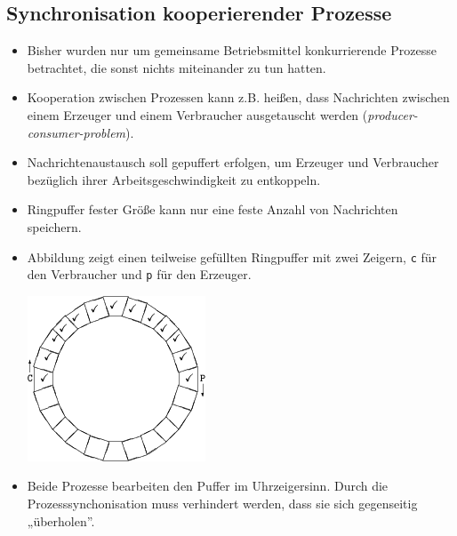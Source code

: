 \documentclass[11pt]{article}
\begin{document}
\subsection*{Synchronisation kooperierender Prozesse}
\label{sec:org7d0f23d}
\begin{itemize}
\item Bisher wurden nur um gemeinsame Betriebsmittel konkurrierende
Prozesse betrachtet, die sonst nichts miteinander zu tun hatten.
\item Kooperation zwischen Prozessen kann z.B. heißen, dass Nachrichten
zwischen einem Erzeuger und einem Verbraucher ausgetauscht werden
(\emph{producer-consumer-problem}).
\item Nachrichtenaustausch soll gepuffert erfolgen, um Erzeuger und
Verbraucher bezüglich ihrer Arbeitsgeschwindigkeit zu entkoppeln.
\item Ringpuffer fester Größe kann nur eine feste Anzahl von Nachrichten
speichern.
\item Abbildung zeigt einen teilweise gefüllten Ringpuffer mit zwei
Zeigern, \texttt{c} für den Verbraucher und \texttt{p} für den Erzeuger.  
\begin{center}
\includegraphics[width=.9\linewidth]{./Abbildungen/ringpuffer.png}
\end{center}

\item Beide Prozesse bearbeiten den Puffer im Uhrzeigersinn. Durch die
Prozesssynchonisation muss verhindert werden, dass sie sich
gegenseitig „überholen”.
\end{itemize}
\end{document}
